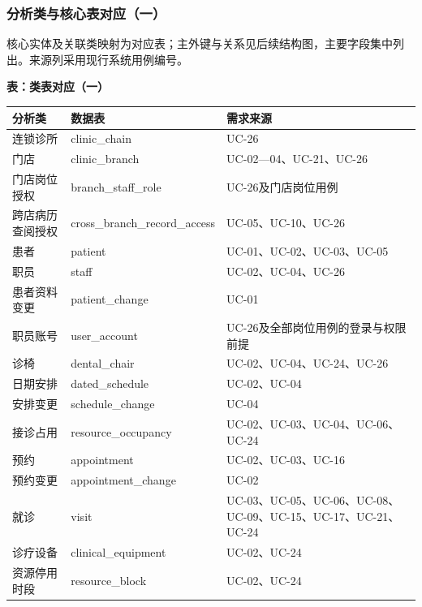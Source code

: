 \documentclass[UTF8,a4paper,zihao=-4,fontset=none]{ctexart}
\begin{document}
\subsubsection{分析类与核心表对应（一）}
核心实体及关联类映射为对应表；主外键与关系见后续结构图，主要字段集中列出。来源列采用现行系统用例编号。\par
\begingroup\small\linespread{0.98}\selectfont
{\setlength{\tabcolsep}{3pt}\renewcommand{\arraystretch}{1.00}
\noindent\textbf{表\thetable：类表对应（一）}\par\smallskip
\noindent\begin{tabular}{@{}>{\raggedright\arraybackslash}p{3.1cm}>{\raggedright\arraybackslash}p{6.5cm}>{\raggedright\arraybackslash}p{6.1cm}@{}}
\toprule
分析类 & 数据表 & 需求来源 \\ \midrule
连锁诊所 & clinic\_\allowbreak{}chain & UC-26 \\
门店 & clinic\_\allowbreak{}branch & UC-02—04、UC-21、UC-26 \\
门店岗位授权 & branch\_\allowbreak{}staff\_\allowbreak{}role & UC-26及门店岗位用例 \\
跨店病历查阅授权 & cross\_\allowbreak{}branch\_\allowbreak{}record\_\allowbreak{}access & UC-05、UC-10、UC-26 \\
患者 & patient & UC-01、UC-02、UC-03、UC-05 \\
职员 & staff & UC-02、UC-04、UC-26 \\
患者资料变更 & patient\_\allowbreak{}change & UC-01 \\
职员账号 & user\_\allowbreak{}account & UC-26及全部岗位用例的登录与权限前提 \\
诊椅 & dental\_\allowbreak{}chair & UC-02、UC-04、UC-24、UC-26 \\
日期安排 & dated\_\allowbreak{}schedule & UC-02、UC-04 \\
安排变更 & schedule\_\allowbreak{}change & UC-04 \\
接诊占用 & resource\_\allowbreak{}occupancy & UC-02、UC-03、UC-04、UC-06、UC-24 \\
预约 & appointment & UC-02、UC-03、UC-16 \\
预约变更 & appointment\_\allowbreak{}change & UC-02 \\
就诊 & visit & UC-03、UC-05、UC-06、UC-08、UC-09、UC-15、UC-17、UC-21、UC-24 \\
诊疗设备 & clinical\_\allowbreak{}equipment & UC-02、UC-24 \\
资源停用时段 & resource\_\allowbreak{}block & UC-02、UC-24 \\

\end{tabular}}
\end{document}
